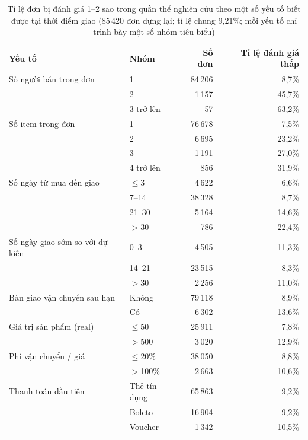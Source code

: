 \begin{table}[htbp]\centering\small
\caption{Tỉ lệ đơn bị đánh giá 1--2 sao trong quần thể nghiên cứu theo một số yếu tố biết được tại thời điểm giao (85\,420 đơn dựng lại; tỉ lệ chung 9,21\%; mỗi yếu tố chỉ trình bày một số nhóm tiêu biểu)}\label{tab:eda-segments}
\begin{tabular}{llrr}
\toprule
Yếu tố & Nhóm & Số đơn & Tỉ lệ đánh giá thấp \\
\midrule
Số người bán trong đơn & 1 & 84\,206 & 8,7\% \\
 & 2 & 1\,157 & 45,7\% \\
 & 3 trở lên & 57 & 63,2\% \\
\addlinespace
Số item trong đơn & 1 & 76\,678 & 7,5\% \\
 & 2 & 6\,695 & 23,2\% \\
 & 3 & 1\,191 & 27,0\% \\
 & 4 trở lên & 856 & 31,9\% \\
\addlinespace
Số ngày từ mua đến giao & $\le$3 & 4\,622 & 6,6\% \\
 & 7--14 & 38\,328 & 8,7\% \\
 & 21--30 & 5\,164 & 14,6\% \\
 & $>$30 & 786 & 22,4\% \\
\addlinespace
Số ngày giao sớm so với dự kiến & 0--3 & 4\,505 & 11,3\% \\
 & 14--21 & 23\,515 & 8,3\% \\
 & $>$30 & 2\,256 & 11,0\% \\
\addlinespace
Bàn giao vận chuyển sau hạn & Không & 79\,118 & 8,9\% \\
 & Có & 6\,302 & 13,6\% \\
\addlinespace
Giá trị sản phẩm (real) & $\le$50 & 25\,911 & 7,8\% \\
 & $>$500 & 3\,020 & 12,9\% \\
\addlinespace
Phí vận chuyển / giá & $\le$20\% & 38\,050 & 8,8\% \\
 & $>$100\% & 2\,663 & 10,6\% \\
\addlinespace
Thanh toán đầu tiên & Thẻ tín dụng & 65\,863 & 9,2\% \\
 & Boleto & 16\,904 & 9,2\% \\
 & Voucher & 1\,342 & 10,5\% \\
\bottomrule
\end{tabular}
\end{table}

